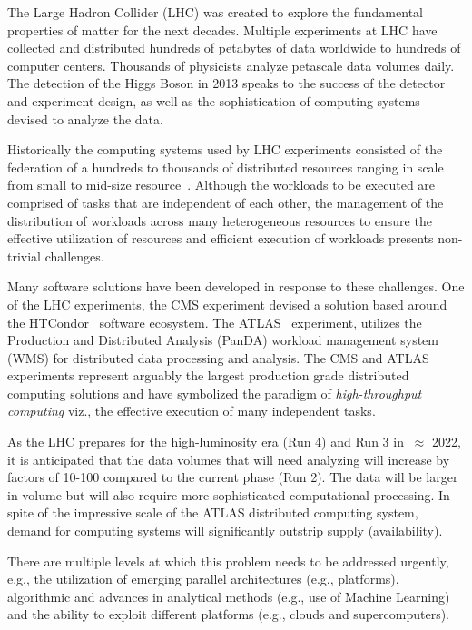 The Large Hadron Collider (LHC) was created to explore the fundamental
properties of matter for the next decades.   Multiple experiments at LHC have
collected and distributed hundreds of petabytes of data worldwide to hundreds
of computer centers. Thousands of physicists analyze petascale data volumes
daily. The detection of the Higgs Boson in 2013 speaks to the success of the
detector and experiment design, as well as the sophistication of computing
systems devised to analyze the data.

Historically the computing systems used by LHC experiments consisted of the
federation of a hundreds to thousands of distributed resources \textemdash{}
ranging in scale from small to mid-size resource~\cite{foster2003grid}.
Although the workloads to be executed are comprised of tasks that are
independent of each other, the management of the distribution of
workloads across many heterogeneous resources to ensure the effective
utilization of resources and efficient execution of workloads presents non-
trivial challenges.

Many software solutions have been developed in response to these challenges.
One of the LHC experiments, the CMS experiment devised a solution based around
the HTCondor~\cite{XX} software ecosystem. The ATLAS~\cite{Aad:2008}
experiment, utilizes the Production and Distributed Analysis (PanDA) workload
management system~\cite{Maeno2011} (WMS) for distributed data processing and
analysis. The CMS and ATLAS experiments represent arguably the largest
production grade distributed computing solutions and have symbolized the
paradigm of {\it high-throughput computing} viz., the effective execution of
many independent tasks.

As the LHC prepares for the high-luminosity era (Run 4) and Run 3 in
$~\approx$ 2022, it is anticipated that the data volumes that will need
analyzing will increase by factors of 10-100  compared to the current phase
(Run 2). The data will be larger in volume but will also require more
sophisticated computational processing. In spite of the impressive scale of
the ATLAS distributed computing system, demand for computing systems will
significantly outstrip supply (availability).

There are multiple levels at which this problem needs to be addressed
urgently, e.g., the utilization of emerging parallel architectures (e.g.,
platforms), algorithmic and advances in analytical methods (e.g., use of
Machine Learning) and the ability to exploit different platforms (e.g., clouds
and supercomputers).

